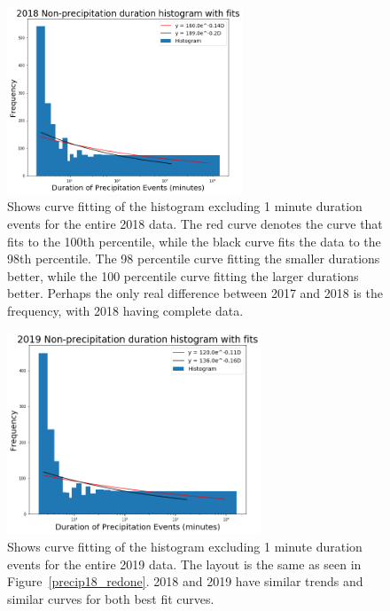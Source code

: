 \documentclass[11pt]{report}
\begin{document}
\begin{figure}[b]
  \centering
  \includegraphics[width=0.625\textwidth]{Figures/nonprecip_2018_new.png}
  \caption[2018 Non-precipitation duration Exponentials with contrasting curve fitting]
  {\label{nonprecip18_redone} Shows curve fitting of the histogram excluding
    1 minute duration events for the entire 2018 data. The red curve denotes
    the curve that fits to the 100th percentile, while the black curve fits
    the data to the 98th percentile. The 98 percentile curve fitting the
    smaller durations better, while the 100 percentile curve fitting the
    larger durations better.  Perhaps the only real difference between 2017
    and 2018 is the frequency, with 2018 having complete data.}
\end{figure}

\clearpage

\begin{figure}[t]
  \centering
  \includegraphics[width=0.675\textwidth]{Figures/nonprecip_2019_new.png}
  \caption[2019 Non-precipitation duration Exponentials with contrasting curve fitting]
  {\label{nonprecip19_redone} Shows curve fitting of the histogram excluding
    1 minute duration events for the entire 2019 data. The layout is the
    same as seen in Figure~\ref{precip18_redone}. 2018 and 2019 have similar trends
    and similar curves for both best fit curves.}
\end{figure}
\end{document}
